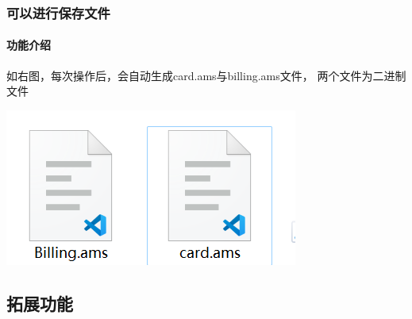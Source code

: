 \documentclass{article}
\begin{document}
    \subsubsection{可以进行保存文件}
    \begin{minipage}[h]{0.5\linewidth}
        \paragraph{功能介绍}
        如右图，每次操作后，会自动生成card.ams与billing.ams文件，
        两个文件为二进制文件 
    \end{minipage}
    \begin{minipage}[h]{0.5\linewidth}
        \centering
        \includegraphics[scale=0.6]{figure/file.png}
        \label{annul}
    \end{minipage}
    \subsection{拓展功能}
\end{document}
